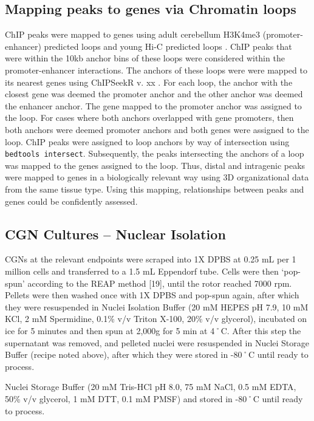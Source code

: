 \documentclass[fleqn,10pt]{wlscirep}
\begin{document}
\subsection*{Mapping peaks to genes via Chromatin loops}
ChIP peaks were mapped to genes using adult cerebellum H3K4me3 (promoter-enhancer) predicted loops \cite{Yamada2019SensoryLearning} and young Hi-C predicted loops \cite{Goodman2019RegulationRemodeling}. ChIP peaks that were within the 10kb anchor bins of these loops were considered within the promoter-enhancer interactions. The anchors of these loops were were mapped to its nearest genes using ChIPSeekR v. xx \cite{}. For each loop, the anchor with the closest gene was deemed the promoter anchor and the other anchor was deemed the enhancer anchor. The gene mapped to the promoter anchor was assigned to the loop. For cases where both anchors overlapped with gene promoters, then both anchors were deemed promoter anchors and both genes were assigned to the loop. ChIP peaks were assigned to loop anchors by way of intersection using \texttt{bedtools intersect}. Subsequently, the peaks intersecting the anchors of a loop was mapped to the genes assigned to the loop. Thus, distal and intragenic peaks were mapped to genes in a biologically relevant way using 3D organizational data from the same tissue type. Using this mapping, relationships between peaks and genes could be confidently assessed.  


\subsection*{CGN Cultures – Nuclear Isolation}
CGNs at the relevant endpoints were scraped into 1X DPBS at 0.25 mL per 1 million cells and transferred to a 1.5 mL Eppendorf tube. Cells were then ‘pop-spun’ according to the REAP method [19], until the rotor reached 7000 rpm. Pellets were then washed once with 1X DPBS and pop-spun again, after which they were resuspended in Nuclei Isolation Buffer (20 mM HEPES pH 7.9, 10 mM KCl, 2 mM Spermidine, 0.1\% v/v Triton X-100, 20\% v/v glycerol), incubated on ice for 5 minutes and then spun at 2,000g for 5 min at 4˚C. After this step the supernatant was removed, and pelleted nuclei were resuspended in Nuclei Storage Buffer (recipe noted above), after which they were stored in -80˚C until ready to process.


Nuclei Storage Buffer (20 mM Tris-HCl pH 8.0, 75 mM NaCl, 0.5 mM EDTA, 50\% v/v glycerol, 1 mM DTT, 0.1 mM PMSF) and stored in -80˚C until ready to process.
\end{document}
